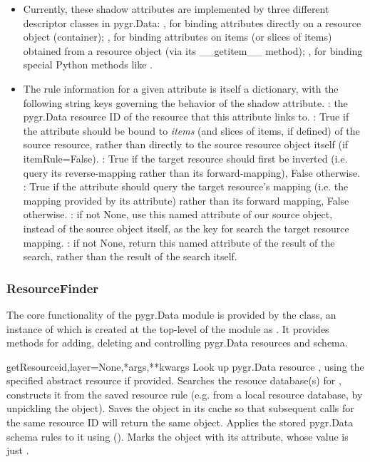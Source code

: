 \documentclass{howto}
\begin{document}
\begin{itemize}
\item Currently, these shadow attributes are implemented by
three different descriptor classes in pygr.Data: 
, for binding attributes directly on a resource
object (container);
 , for binding attributes on items (or slices of
items) obtained from a resource object (via its __getitem__ method);
, for binding special Python methods like
.

\item The rule information for a given attribute is itself a dictionary,
with the following string keys governing the behavior of the shadow attribute.
: the pygr.Data resource ID of the resource that this
attribute links to.
: True if the attribute should be bound to {\em items}
(and slices of items, if defined) of the source resource, rather than
directly to the source resource object itself (if itemRule=False).
: True if the target resource should first be inverted
(i.e. query its reverse-mapping rather than its forward-mapping), False otherwise.
: True if the attribute should query the target resource's
 mapping (i.e. the mapping provided by its  attribute)
rather than its forward mapping, False otherwise.
: if not None, use this named attribute of our source object,
instead of the source object itself, as the key for search the target resource
mapping.
: if not None, return this named attribute of the result of
the search, rather than the result of the search itself.
\end{itemize}

\subsubsection{ResourceFinder}
The core functionality of the pygr.Data module is provided by the
 class, an instance of which is created at the
top-level of the module as .  It 
provides methods for adding, deleting and controlling pygr.Data
resources and schema.

\begin{funcdesc}{getResource}{id,layer=None,*args,**kwargs}
  Look up pygr.Data resource , using the specified abstract
  resource  if provided.  Searches the resouce database(s)
  for , constructs it from the saved resource rule (e.g. from
  a local resource database, by unpickling the object).  Saves the 
  object in its cache so that subsequent calls for the same resource
  ID will return the same object.  Applies the stored pygr.Data schema
  rules to it using ().  Marks the object with
  its  attribute, whose value is just .
\end{funcdesc}
\end{document}
